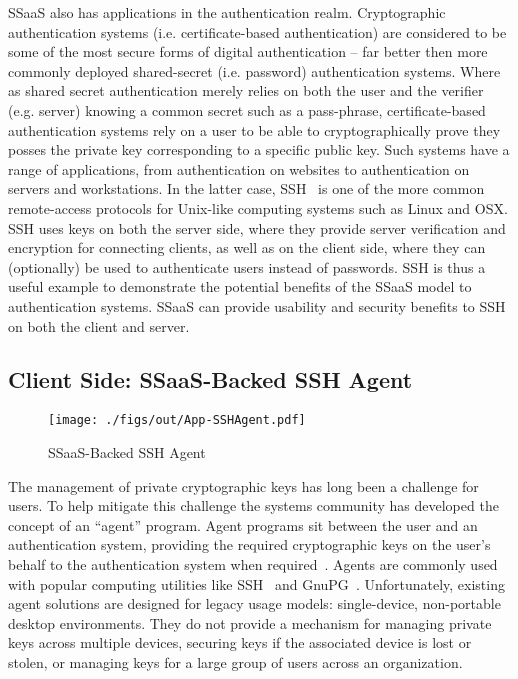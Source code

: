SSaaS also has applications in the authentication realm. Cryptographic
authentication systems (i.e. certificate-based authentication) are
considered to be some of the most secure forms of digital
authentication -- far better then more commonly deployed shared-secret
(i.e. password) authentication systems. Where as shared secret
authentication merely relies on both the user and the verifier
(e.g. server) knowing a common secret such as a pass-phrase,
certificate-based authentication systems rely on a user to be able to
cryptographically prove they posses the private key corresponding to a
specific public key. Such systems have a range of applications, from
authentication on websites to authentication on servers and
workstations. In the latter case, SSH~\cite{ylonen1996} is one of the
more common remote-access protocols for Unix-like computing systems
such as Linux and OSX. SSH uses keys on both the server side, where
they provide server verification and encryption for connecting
clients, as well as on the client side, where they can (optionally) be
used to authenticate users instead of passwords. SSH is thus a useful
example to demonstrate the potential benefits of the SSaaS model to
authentication systems. SSaaS can provide usability and security
benefits to SSH on both the client and server.

\subsection{Client Side: SSaaS-Backed SSH Agent}

\begin{figure}[t]
  \centering
  \texttt{[image: ./figs/out/App-SSHAgent.pdf]}
  \caption{SSaaS-Backed SSH Agent}
  \label{fig:app-sshagent}
\end{figure}

The management of private cryptographic keys has long been a challenge
for users. To help mitigate this challenge the systems community has
developed the concept of an ``agent'' program. Agent programs sit
between the user and an authentication system, providing the required
cryptographic keys on the user's behalf to the authentication system
when required~\cite{cox2002}. Agents are commonly used with popular
computing utilities like SSH~\cite{ylonen1996} and
GnuPG~\cite{gnupg}. Unfortunately, existing agent solutions are
designed for legacy usage models: single-device, non-portable desktop
environments. They do not provide a mechanism for managing private
keys across multiple devices, securing keys if the associated device
is lost or stolen, or managing keys for a large group of users across
an organization.

